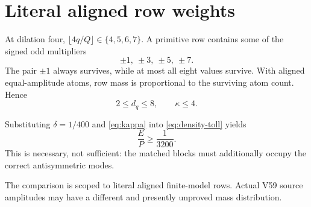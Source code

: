 \section{Literal aligned row weights}

At dilation four, $\lfloor4q/Q\rfloor\in\{4,5,6,7\}$.  A primitive row contains
some of the signed odd multipliers
\[
 \pm1,\ \pm3,\ \pm5,\ \pm7.
\]
The pair $\pm1$ always survives, while at most all eight values survive.  With aligned
equal-amplitude atoms, row mass is proportional to the surviving atom count.  Hence
\begin{equation}
 2\le d_q\le8,\qquad \kappa\le4.
 \label{eq:kappa}
\end{equation}

Substituting $\delta=1/400$ and \eqref{eq:kappa} into
\eqref{eq:density-toll} yields
\begin{equation}
 \frac EP\ge\frac1{3200}.
 \label{eq:endpoint-toll}
\end{equation}
This is necessary, not sufficient: the matched blocks must additionally occupy the
correct antisymmetric modes.

The comparison is scoped to literal aligned finite-model rows.  Actual V59 source
amplitudes may have a different and presently unproved mass distribution.
